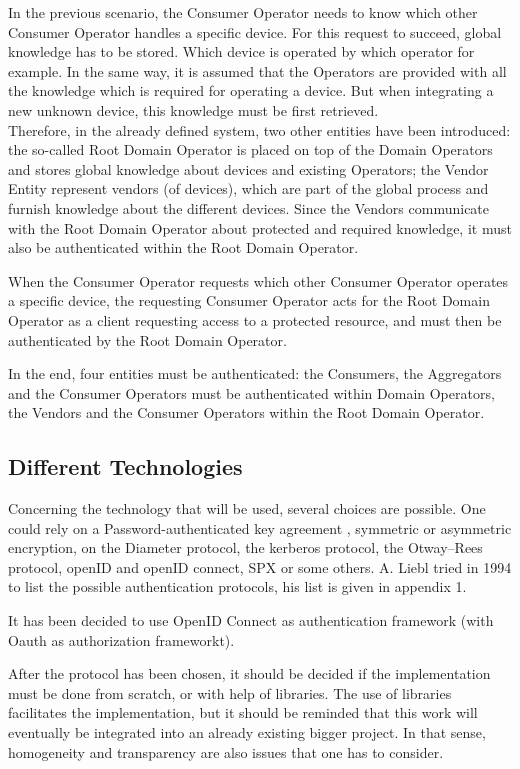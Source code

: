 In the previous scenario, the Consumer Operator needs to know which other Consumer Operator handles a specific device. For this request to succeed, global knowledge has to be stored. Which device is operated by which operator for example. In the same way, it is assumed that the Operators are provided with all the knowledge which is required for operating a device. But when integrating a new unknown device, this knowledge must be first retrieved. \\Therefore, in the already defined system, two other entities have been introduced: the so-called Root Domain Operator is placed on top of the Domain Operators and stores global knowledge about devices and existing Operators; the Vendor Entity represent vendors (of devices), which are part of the global process and furnish knowledge about the different devices. Since the Vendors communicate with the Root Domain Operator about protected and required knowledge, it must also be authenticated within the Root Domain Operator. 

When the Consumer Operator requests which other Consumer Operator operates a specific device, the requesting Consumer Operator acts for the Root Domain Operator as a client requesting access to a protected resource, and must then be authenticated by the Root Domain Operator.

In the end, four entities must be authenticated: the Consumers, the Aggregators and the Consumer Operators must be authenticated within Domain Operators, the Vendors and the Consumer Operators within the Root Domain Operator.

\subsection{Different Technologies}
Concerning the technology that will be used, several choices are possible. One could rely on a Password-authenticated key agreement \cite{Hao2011}\cite{Pointcheval2012}\cite{Juang2008}, symmetric or asymmetric encryption\cite{Woo1997}\cite{Denning1982}, on the Diameter protocol, the kerberos protocol\cite{Sundareswaran}, the Otway–Rees protocol, openID\cite{Ghazizadeh} and openID connect, SPX\cite{Tardo1991} or some others. A. Liebl tried in 1994 to list the possible authentication protocols, his list is given in appendix 1.

It has been decided to use OpenID Connect as authentication framework (with Oauth as authorization frameworkt).

After the protocol has been chosen, it should be decided if the implementation must be done from scratch, or with help of libraries. The use of libraries facilitates the implementation, but it should be reminded that this work will eventually be integrated into an already existing bigger project. In that sense, homogeneity and transparency are also issues that one has to consider. 

